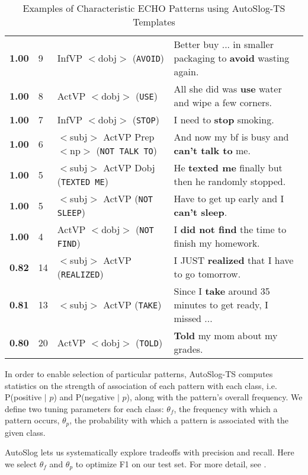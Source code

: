 \documentclass[11pt,letterpaper]{article}
\begin{document}
\begin{table*}[t!h]
\begin{small}
\begin{tabular}{@{}P{0.55cm}|P{0.52cm}|P{5.9cm}|P{7.7cm}@{}}
\bf 1.00 & 9 & InfVP $<$dobj$>$ (\texttt{AVOID}) & Better buy ... in smaller packaging to \textbf{avoid} wasting again.\\ 
\bf 1.00 & 8 & ActVP $<$dobj$>$ (\texttt{USE}) & All she did was \textbf{use} water and wipe a few corners. \\ 
\bf 1.00 & 7& InfVP $<$dobj$>$  (\texttt{STOP}) & I need to \textbf{stop} smoking. \\ 
\bf 1.00 & 6 & $<$subj$>$ ActVP Prep $<$np$>$ (\texttt{NOT TALK TO}) & And now my bf is busy and \textbf{can't talk to} me. \\ 
\bf 1.00 & 5 & $<$subj$>$ ActVP Dobj  (\texttt{TEXTED ME}) & He \textbf{texted me} finally but then he randomly stopped. \\ 
\bf 1.00 & 5 & $<$subj$>$ ActVP (\texttt{NOT SLEEP}) & Have to get up early and I \textbf{can't sleep}.\\ 
\bf 1.00 & 4 & ActVP $<$dobj$>$ (\texttt{NOT FIND}) & I \textbf{did not find} the time to finish my homework. \\ 
\bf 0.82 & 14 & $<$subj$>$ ActVP (\texttt{REALIZED}) & I JUST \textbf{realized} that I have to go tomorrow. \\ 
\bf 0.81 & 13 & $<$subj$>$ ActVP (\texttt{TAKE}) & Since I \textbf{take} around 35 minutes to get ready, I missed ... \\ 
\bf 0.80 & 20 & ActVP $<$dobj$>$ (\texttt{TOLD}) & \textbf{Told} my mom about my grades. \\ 
 \bottomrule
 
 
 \end{tabular}
\end{small}
\caption{\label{table:high-patterns} Examples of Characteristic ECHO Patterns using AutoSlog-TS Templates\\}
\vspace{-.1in}
\end{table*}


In order to enable selection of particular patterns,
AutoSlog-TS computes statistics on
the strength of association of each pattern with each class,
i.e. P({\sc positive} $\mid$ $p$) and P({\sc negative} $\mid$
$p$), along with the pattern's overall frequency. We define two tuning parameters for each
class: $\theta_f$, the frequency with which a pattern occurs,
$\theta_p$, the probability with which a pattern is associated with
the given class.

AutoSlog lets us systematically explore tradeoffs with precision and recall.
Here we select $\theta_f$ and $\theta_p$ to optimize F1 on our test set.
For more detail, see \cite{Riloff96,Orabyetal15}. 
\end{document}
